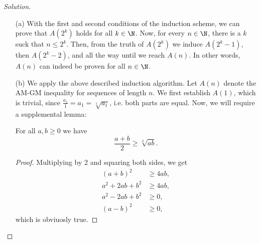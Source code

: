 \begin{proof}[Solution]~
    \begin{itemize}
        \item[(a)]
            With the first and second conditions of the induction scheme, we can prove that $A(2^k)$ holds for all $k \in \N$. Now, for every $n \in \N$, there is a $k$ suck that $n \leqslant 2^k$. Then, from the truth of $A(2^k)$ we induce $A(2^k-1)$, then $A(2^k - 2)$, and all the way until we reach $A(n)$. In other words, $A(n)$ can indeed be proven for all $n \in \N$.
        \item[(b)]
            We apply the above described induction algorithm. Let $A(n)$ denote the AM-GM inequality for sequences of length $n$. We first establish $A(1)$, which is trivial, since $\frac{a_1}{1} = a_1 = \sqrt[1]{a_1}$, i.e. both parts are equal. Now, we will require a supplemental lemma:
            \begin{lemma} \label{amgm}
                For all $a, b \geqslant 0$ we have
                \[ \frac{a+b}{2} \geqslant \sqrt[2]{ab}. \] 
            \end{lemma}
            \begin{proof}
                Multiplying by 2 and squaring both sides, we get
                \begin{align*}
                    (a + b)^2 &\geqslant 4ab,\\
                    a^2 + 2ab + b^2 &\geqslant 4ab,\\
                    a^2 - 2ab + b^2 &\geqslant 0,\\
                    (a-b)^2 &\geqslant 0,
                \end{align*}
                which is obviuosly true.
            \end{proof}


\end{itemize}
\end{proof}
